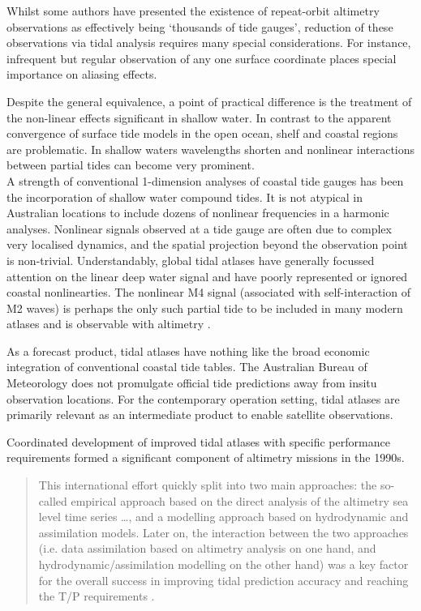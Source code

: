 Whilst some authors have presented the existence of repeat-orbit altimetry observations as effectively being `thousands of tide gauges', reduction of these observations via tidal analysis requires many special considerations.  For instance, infrequent but regular observation of any one surface coordinate places special importance on aliasing effects.



Despite the general equivalence, a point of practical difference is the treatment of the non-linear effects significant in shallow water.
In contrast to the apparent convergence of surface tide models in the open ocean, shelf and coastal regions are problematic.   In shallow waters wavelengths shorten and nonlinear interactions between partial tides can become very prominent.  \\
A strength of conventional 1-dimension analyses of coastal tide gauges has been the incorporation of shallow water compound tides.  It is not atypical in Australian locations to include dozens of nonlinear frequencies in a harmonic analyses.   Nonlinear signals observed at a tide gauge are often due to complex very localised dynamics, and the spatial projection beyond the observation point is non-trivial.  Understandably, global tidal atlases have generally focussed attention on the linear deep water signal and have poorly represented or ignored coastal nonlinearties.  The nonlinear M4 signal (associated with self-interaction of M2 waves) is perhaps the only such partial tide to be included in many modern atlases and is observable with altimetry \cite{Ray:2010jm}.


As a forecast product, tidal atlases have nothing like the broad economic integration of conventional coastal tide tables.  The Australian Bureau of Meteorology does not promulgate official tide predictions away from insitu observation locations. 
For the contemporary operation setting, tidal atlases are primarily relevant as an intermediate product to enable satellite observations.



Coordinated development of improved tidal atlases with specific performance requirements formed a significant component of altimetry missions in the 1990s.
\begin{quotation}
This international effort quickly split into two main approaches: the so-called empirical approach based on the direct analysis of the altimetry sea level time series \dots{}, and a modelling approach based on hydrodynamic and assimilation models. Later on, the interaction between the two approaches (i.e. data assimilation based on altimetry analysis on one hand, and hydrodynamic/assimilation modelling on the other hand) was a key factor for the overall success in improving tidal prediction accuracy and reaching the T/P requirements \cite[pp394]{Lefevre:2011dg}.
\end{quotation}


